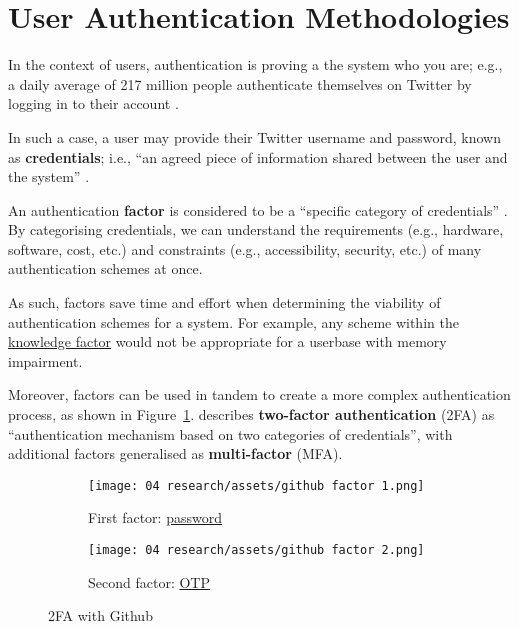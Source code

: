 \section{User Authentication Methodologies}
\label{s:authAuth}

In the context of users, \gls{authentication} is proving a
the system who you are; e.g., a daily average of 217
million people authenticate themselves on Twitter by
logging in to their account \parencite[][Q4]{twitterUsage}.

In such a case, a user may provide their Twitter username
and password, known as \textbf{credentials}; i.e.,
\enquote{an agreed piece of information shared between the
  user and the system} \parencite{whatIsAuth}.

An authentication \textbf{factor} is considered to be a
\enquote{specific category of credentials}
\parencite{whatIsAuth}.
By categorising credentials, we can understand the
requirements (e.g., hardware, software, cost, etc.) and
constraints (e.g., accessibility, security, etc.) of many
authentication schemes at once.

As such, factors save time and effort when determining the
viability of authentication schemes for a system.
For example, any scheme within the
\hyperref[p:knowledge]{knowledge factor} would not be
appropriate for a userbase with memory impairment.

Moreover, factors can be used in tandem to create a more
complex authentication process, as shown in
Figure~\ref{fig:github2fa}.
\cite{whatIsAuth} describes
\textbf{two-factor authentication} (2FA) as
\enquote{authentication mechanism based on two categories
  of credentials}, with additional factors generalised as
\textbf{multi-factor} (MFA).

\begin{figure}[h]
  \centering
  \begin{subfigure}{\subfigwidth}
    \centering
    \texttt{[image: 04
      research/assets/github factor 1.png]}
    \caption{First factor:
      \hyperref[p:passwords]{password}}
  \end{subfigure}
  \begin{subfigure}{\subfigwidth}
    \centering
    \texttt{[image: 04
      research/assets/github factor 2.png]}
    \caption{Second factor: \hyperref[p:otp]{OTP}}

  \end{subfigure}

  \caption{2FA with Github}
  \label{fig:github2fa}
\end{figure}

